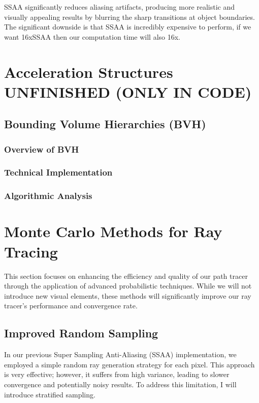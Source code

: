\documentclass[12pt]{article}
\begin{document}
SSAA significantly reduces aliasing artifacts, producing more realistic and visually appealing results by blurring the sharp transitions at object boundaries. The significant downside is that SSAA is incredibly expensive to perform, if we want 16xSSAA then our computation time will also 16x.

\section{Acceleration Structures UNFINISHED (ONLY IN CODE)}
\label{sec:acceleration-structures}
\subsection{Bounding Volume Hierarchies (BVH)}
\subsubsection{Overview of BVH}
\subsubsection{Technical Implementation}
\subsubsection{Algorithmic Analysis}

\pagebreak
\section{Monte Carlo Methods for Ray Tracing}
\label{sec:monte-carlo}

This section focuses on enhancing the efficiency and quality of our path tracer through the application of advanced probabilistic techniques. While we will not introduce new visual elements, these methods will significantly improve our ray tracer's performance and convergence rate.

\subsection{Improved Random Sampling}
In our previous Super Sampling Anti-Aliasing (SSAA) implementation, we employed a simple random ray generation strategy for each pixel. This approach is very effective; however, it suffers from high variance, leading to slower convergence and potentially noisy results. To address this limitation, I will introduce stratified sampling.
\end{document}
